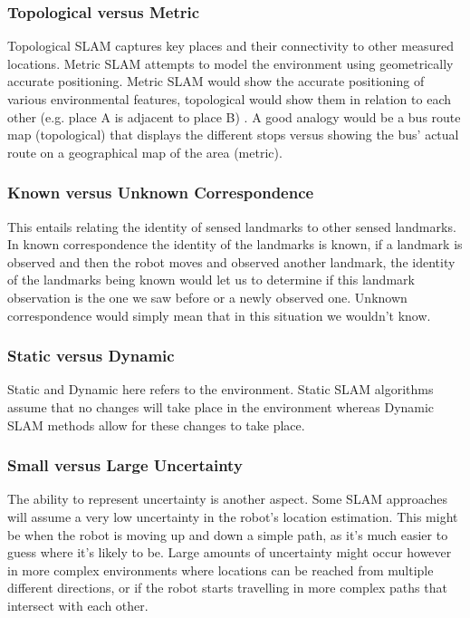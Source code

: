 					\subsubsection{Topological versus Metric}
					Topological SLAM captures key places and their connectivity to other measured locations. Metric SLAM attempts to model the environment using geometrically accurate positioning. Metric SLAM would show the accurate positioning of various environmental features, topological would show them in relation to each other (e.g. place A is adjacent to place B) \citep{thrun2008simultaneous}. A good analogy would be a bus route map (topological) that displays the different stops versus showing the bus' actual route on a geographical map of the area (metric).
					
					\subsubsection{Known versus Unknown Correspondence}
					This entails relating the identity of sensed landmarks to other sensed landmarks. In known correspondence the identity of the landmarks is known, if a landmark is observed and then the robot moves and observed another landmark, the identity of the landmarks being known would let us to determine if this landmark observation is the one we saw before or a newly observed one. Unknown correspondence would simply mean that in this situation we wouldn't know.	
					
					\subsubsection{Static versus Dynamic}
					Static and Dynamic here refers to the environment. Static SLAM algorithms assume that no changes will take place in the environment whereas Dynamic SLAM methods allow for these changes to take place.
					
					\subsubsection{Small versus Large Uncertainty}
					The ability to represent uncertainty is another aspect. Some SLAM approaches will assume a very low uncertainty in the robot's location estimation. This might be when the robot is moving up and down a simple path, as it's much easier to guess where it's likely to be. Large amounts of uncertainty might occur however in more complex environments where locations can be reached from multiple different directions, or if the robot starts travelling in more complex paths that intersect with each other.
					
